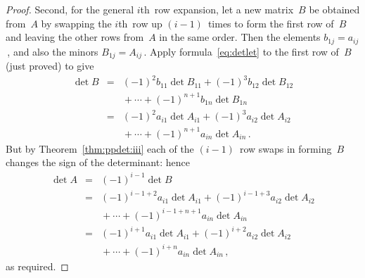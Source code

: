 \begin{proof}
Second, for the general \(i\)th~row expansion, let a new matrix~\(B\) be obtained from~\(A\) by swapping the \(i\)th~row up \((i-1)\)~times to form the first row of~\(B\) and leaving the other rows from~\(A\) in the same order.
Then the elements \(b_{1j}=a_{ij}\)\,, and also the minors \(B_{1j}=A_{ij}\)\,.
Apply formula~\eqref{eq:detlet} to the first row of~\(B\) (just proved) to give
\begin{eqnarray*}
\det B&=&(-1)^2b_{11}\det B_{11}
+(-1)^3b_{12}\det B_{12}
\\&&{}
+\cdots
+(-1)^{n+1}b_{1n}\det B_{1n}
\\&=&(-1)^2a_{i1}\det A_{i1}
+(-1)^3a_{i2}\det A_{i2}
\\&&{}
+\cdots
+(-1)^{n+1}a_{in}\det A_{in}\,.
\end{eqnarray*}
But by Theorem~\ref{thm:ppdet:iii} each of the \((i-1)\)~row swaps in forming~\(B\) changes the sign of the determinant: hence
\begin{eqnarray*}
\det A&=&(-1)^{i-1}\det B
\\&=&(-1)^{i-1+2}a_{i1}\det A_{i1}
+(-1)^{i-1+3}a_{i2}\det A_{i2}
\\&&{}
+\cdots
+(-1)^{i-1+n+1}a_{in}\det A_{in}
\\&=&(-1)^{i+1}a_{i1}\det A_{i1}
+(-1)^{i+2}a_{i2}\det A_{i2}
\\&&{}
+\cdots
+(-1)^{i+n}a_{in}\det A_{in}\,,
\end{eqnarray*}
as required.
\end{proof}



